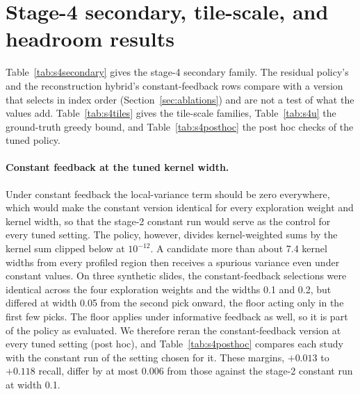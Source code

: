 \documentclass[10pt]{article}
\newcommand{\fittable}[1]{\resizebox{\ifdim\width>\linewidth\linewidth\else\width\fi}{!}{#1}}
\begin{document}
\section{Stage-4 secondary, tile-scale, and headroom results}
\label{app:stage4}

Table~\ref{tab:s4secondary} gives the stage-4 secondary family. The residual policy's and the reconstruction
hybrid's constant-feedback rows compare with a version that selects in index order (Section~\ref{sec:ablations}) and
are not a test of what the values add. Table~\ref{tab:s4tiles} gives the tile-scale families,
Table~\ref{tab:s4u} the ground-truth greedy bound, and Table~\ref{tab:s4posthoc} the post hoc checks of the tuned
policy.

\paragraph{Constant feedback at the tuned kernel width.} Under constant feedback the local-variance term should be
zero everywhere, which would make the constant version identical for every exploration weight and kernel width, so
that the stage-2 constant run would serve as the control for every tuned setting. The policy, however, divides
kernel-weighted sums by the kernel sum clipped below at $10^{-12}$. A candidate more than about 7.4 kernel widths from
every profiled region then receives a spurious variance even under constant values. On three synthetic slides, the
constant-feedback selections were identical across the four exploration weights and the widths 0.1 and 0.2, but
differed at width 0.05 from the second pick onward, the floor acting only in the first few picks. The floor applies
under informative feedback as well, so it is part of the policy as evaluated. We therefore reran the constant-feedback
version at every tuned setting (post hoc), and Table~\ref{tab:s4posthoc} compares each study with the constant run of
the setting chosen for it. These margins, $+0.013$ to $+0.118$ recall, differ by at most 0.006 from those against
the stage-2 constant run at width 0.1.

\begin{table}[H]
\centering
\caption{Stage-4 secondary margins on the common evaluation set, 22 slides. $\Delta$ with unadjusted 95\% CI
resampling studies; $p_H$ Holm-adjusted over the 30 secondary margins; MDE$_H$ at 80\% power and $\alpha=0.05/30$.}
\label{tab:s4secondary}
\fittable{\small}
\end{table}
\end{document}
